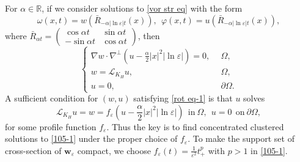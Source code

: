 \documentclass[12pt,reqno]{amsart}
\numberwithin{equation}{section}
\theoremstyle{definition}
\theoremstyle{remark}
\begin{document}
For $ \alpha \in\mathbb{R} $, if we consider    solutions to \eqref{vor str eq} with the form
\begin{equation}\label{104}
\omega(x,t)=w\left (\bar{R}_{-\alpha|\ln\varepsilon| t}(x)\right ),\ \ \varphi(x,t)=u\left (\bar{R}_{-\alpha|\ln\varepsilon| t}(x)\right ),
\end{equation}
where   $ \bar{R}_{\alpha t}=\begin{pmatrix}
\cos\alpha t & \sin\alpha t \\
-\sin\alpha t &\cos\alpha t
\end{pmatrix} $, then %
\begin{equation}\label{rot eq-1}
\begin{cases}
\nabla w\cdot \nabla^\perp \left( u-\frac{\alpha}{2}|x|^2|\ln\varepsilon|\right) =0,\ \ &\Omega,\\
w=\mathcal{L}_{K_H}u,\ \ &\Omega,\\
u=0,\ \ &\partial\Omega.
\end{cases}
\end{equation}
A sufficient condition for $ (w,u) $ satisfying \eqref{rot eq-1} is that $ u $ solves 
\begin{equation}\label{105-1}
\mathcal{L}_{K_H} u=w=f_\varepsilon\left( u-\frac{\alpha}{2}|x|^2|\ln\varepsilon|\right)\ \  \text{in}\ \Omega,\ \ u=0\ \ \text{on}\ \partial\Omega,
\end{equation}
for some profile function $ f_\varepsilon $. Thus the key is to find concentrated clustered solutions to \eqref{105-1} under the proper choice of $ f_\varepsilon $. To make the support set of cross-section of $ \textbf{w}_\varepsilon $ compact, we choose $ f_\varepsilon(t)=\frac{1}{\varepsilon^2}t^p_+ $ with $ p>1 $ in \eqref{105-1}.
\end{document}
